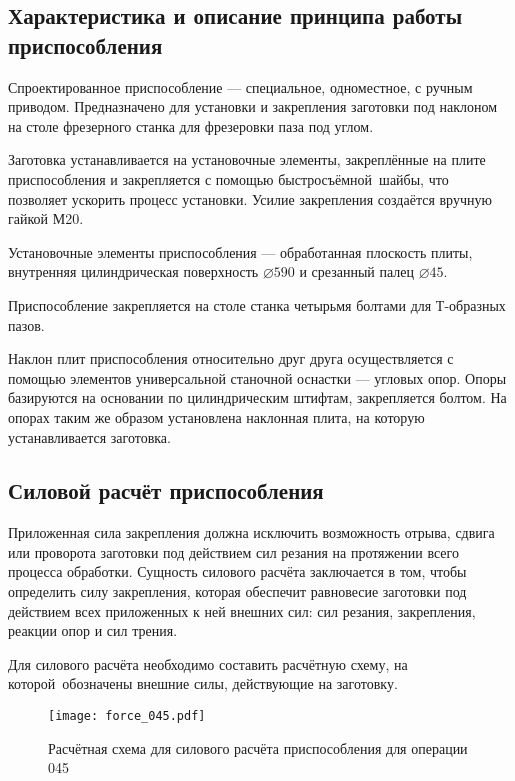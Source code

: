 \documentclass[14pt,russian,a4paper]{extreport}
\begin{document}
\subsection{Характеристика и описание принципа работы приспособления}

Спроектированное приспособление --- специальное, одноместное, с ручным приводом. Предназначено для установки и закрепления заготовки под наклоном на столе фрезерного станка для фрезеровки паза под углом.

Заготовка устанавливается на установочные элементы, закреплённые на плите приспособления и закрепляется с помощью быстросъёмной шайбы, что позволяет ускорить процесс установки. Усилие закрепления создаётся вручную гайкой М20.

Установочные элементы приспособления --- обработанная плоскость плиты, внутренняя цилиндрическая поверхность $\diameter 590$ и срезанный палец $\diameter 45$.

Приспособление закрепляется на столе станка четырьмя болтами для Т-образных пазов.

Наклон плит приспособления относительно друг друга осуществляется с помощью элементов универсальной станочной оснастки --- угловых опор. Опоры базируются на основании по цилиндрическим штифтам, закрепляется болтом. На опорах таким же образом установлена наклонная плита, на которую устанавливается заготовка.

\subsection{Силовой расчёт приспособления}

Приложенная сила закрепления должна исключить возможность отрыва, сдвига или проворота заготовки под действием сил резания на протяжении всего процесса обработки. Сущность силового расчёта заключается в том, чтобы определить силу закрепления, которая обеспечит равновесие заготовки под действием всех приложенных к ней внешних сил: сил резания, закрепления, реакции опор и сил трения.

Для силового расчёта необходимо составить расчётную схему, на которой обозначены внешние силы, действующие на заготовку.

\begin{figure}[H]
	\centering
	   \texttt{[image: force\_045.pdf]}
	   \caption{Расчётная схема для силового расчёта приспособления для операции 045}
	   \label{fig:f045}
\end{figure}
\end{document}
